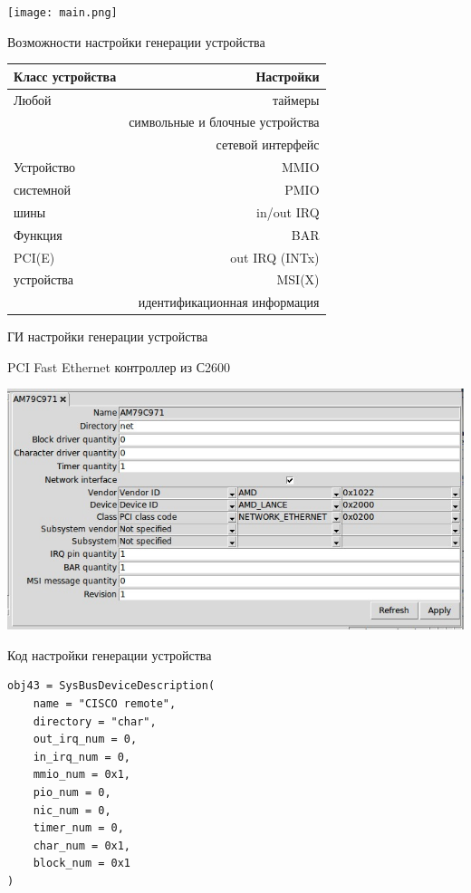 \documentclass[unicode,hyperref={unicode=true}]{beamer}
\theoremstyle{definition}
\theoremstyle{plain}
\begin{document}
\begin{frame}{}
\texttt{[image: main.png]}
\end{frame}



\begin{frame}{Возможности настройки генерации устройства}
\begin{center}
\begin{tabular}{l|r}
Класс устройства & Настройки \\
\hline
Любой            & таймеры \\
                 & символьные и блочные устройства \\
                 & сетевой интерфейс \\
\hline
Устройство       & MMIO \\
системной        & PMIO \\
шины             & in/out IRQ \\
\hline
Функция          & BAR \\
PCI(E)           & out IRQ (INTx) \\
устройства       & MSI(X) \\
                 & идентификационная информация
\end{tabular}
\end{center}
\end{frame}



\begin{frame}{ГИ настройки генерации устройства}
\begin{center}
PCI Fast Ethernet контроллер из С2600
\end{center}
\includegraphics[width=\linewidth]{AM79C971.jpg}
\end{frame}



\begin{frame}[fragile]{Код настройки генерации устройства}

\lstset{language=Python}
\begin{lstlisting}
obj43 = SysBusDeviceDescription(
    name = "CISCO remote",
    directory = "char",
    out_irq_num = 0,
    in_irq_num = 0,
    mmio_num = 0x1,
    pio_num = 0,
    nic_num = 0,
    timer_num = 0,
    char_num = 0x1,
    block_num = 0x1
)
\end{lstlisting}

\end{frame}
\end{document}
